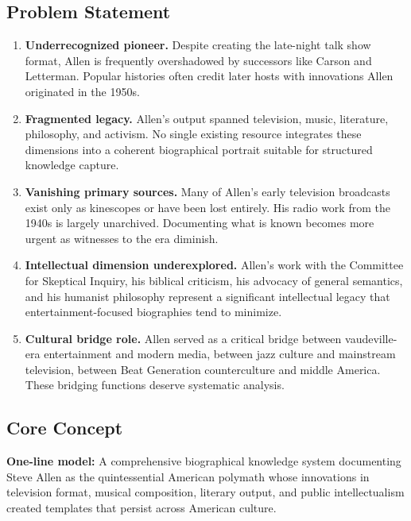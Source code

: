 \documentclass[11pt,letterpaper]{article}
\begin{document}
\subsection{Problem Statement}

\begin{enumerate}[leftmargin=2em]
\item \textbf{Underrecognized pioneer.} Despite creating the late-night talk show format, Allen is frequently overshadowed by successors like Carson and Letterman. Popular histories often credit later hosts with innovations Allen originated in the 1950s.

\item \textbf{Fragmented legacy.} Allen's output spanned television, music, literature, philosophy, and activism. No single existing resource integrates these dimensions into a coherent biographical portrait suitable for structured knowledge capture.

\item \textbf{Vanishing primary sources.} Many of Allen's early television broadcasts exist only as kinescopes or have been lost entirely. His radio work from the 1940s is largely unarchived. Documenting what is known becomes more urgent as witnesses to the era diminish.

\item \textbf{Intellectual dimension underexplored.} Allen's work with the Committee for Skeptical Inquiry, his biblical criticism, his advocacy of general semantics, and his humanist philosophy represent a significant intellectual legacy that entertainment-focused biographies tend to minimize.

\item \textbf{Cultural bridge role.} Allen served as a critical bridge between vaudeville-era entertainment and modern media, between jazz culture and mainstream television, between Beat Generation counterculture and middle America. These bridging functions deserve systematic analysis.
\end{enumerate}

\subsection{Core Concept}

\textbf{One-line model:} A comprehensive biographical knowledge system documenting Steve Allen as the quintessential American polymath whose innovations in television format, musical composition, literary output, and public intellectualism created templates that persist across American culture.
\end{document}
